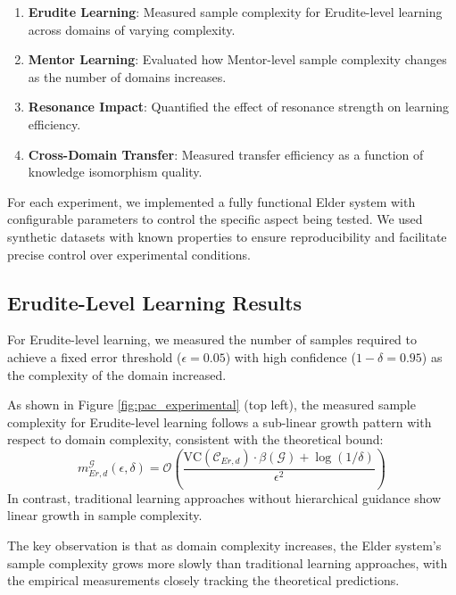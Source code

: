 \begin{enumerate}
    \item \textbf{Erudite Learning}: Measured sample complexity for Erudite-level learning across domains of varying complexity.
    
    \item \textbf{Mentor Learning}: Evaluated how Mentor-level sample complexity changes as the number of domains increases.
    
    \item \textbf{Resonance Impact}: Quantified the effect of resonance strength on learning efficiency.
    
    \item \textbf{Cross-Domain Transfer}: Measured transfer efficiency as a function of knowledge isomorphism quality.
\end{enumerate}

For each experiment, we implemented a fully functional Elder system with configurable parameters to control the specific aspect being tested. We used synthetic datasets with known properties to ensure reproducibility and facilitate precise control over experimental conditions.

\subsection{Erudite-Level Learning Results}

For Erudite-level learning, we measured the number of samples required to achieve a fixed error threshold ($\epsilon = 0.05$) with high confidence ($1-\delta = 0.95$) as the complexity of the domain increased.

\begin{result}
As shown in Figure \ref{fig:pac_experimental} (top left), the measured sample complexity for Erudite-level learning follows a sub-linear growth pattern with respect to domain complexity, consistent with the theoretical bound:
\begin{equation}
m_{Er,d}^{\mathcal{G}}(\epsilon, \delta) = \mathcal{O}\left(\frac{\text{VC}(\mathcal{C}_{Er,d}) \cdot \beta(\mathcal{G}) + \log(1/\delta)}{\epsilon^2}\right)
\end{equation}
In contrast, traditional learning approaches without hierarchical guidance show linear growth in sample complexity.
\end{result}

The key observation is that as domain complexity increases, the Elder system's sample complexity grows more slowly than traditional learning approaches, with the empirical measurements closely tracking the theoretical predictions.

